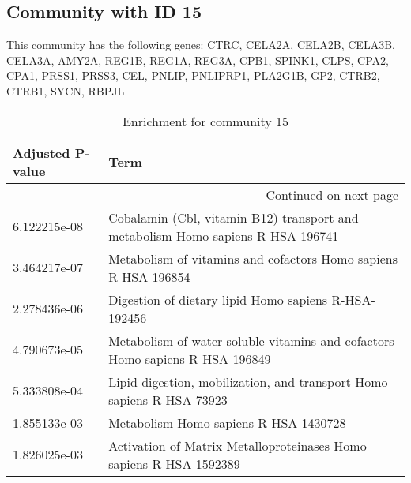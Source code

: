 \subsection*{Community with ID 15}
This community has the following genes: CTRC, CELA2A, CELA2B, CELA3B, CELA3A, AMY2A, REG1B, REG1A, REG3A, CPB1, SPINK1, CLPS, CPA2, CPA1, PRSS1, PRSS3, CEL, PNLIP, PNLIPRP1, PLA2G1B, GP2, CTRB2, CTRB1, SYCN, RBPJL
\\
\begin{longtable}{p{2.4cm}p{14.5cm}}
\caption{Enrichment for community 15}\\
\toprule
Adjusted \newline P-value &                                                                             Term \\
\midrule
\endhead
\midrule
\multicolumn{2}{r}{{Continued on next page}} \\
\midrule
\endfoot

\bottomrule
\endlastfoot
             6.122215e-08 &  Cobalamin (Cbl, vitamin B12) transport and metabolism Homo sapiens R-HSA-196741 \\
             3.464217e-07 &                   Metabolism of vitamins and cofactors Homo sapiens R-HSA-196854 \\
             2.278436e-06 &                             Digestion of dietary lipid Homo sapiens R-HSA-192456 \\
             4.790673e-05 &     Metabolism of water-soluble vitamins and cofactors Homo sapiens R-HSA-196849 \\
             5.333808e-04 &            Lipid digestion, mobilization, and transport Homo sapiens R-HSA-73923 \\
             1.855133e-03 &                                            Metabolism Homo sapiens R-HSA-1430728 \\
             1.826025e-03 &               Activation of Matrix Metalloproteinases Homo sapiens R-HSA-1592389 \\
\end{longtable}


